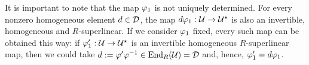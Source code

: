 \documentclass{amsbook}
\begin{document}
















It is important to note that the map $\varphi_1$ is not uniquely determined. For every nonzero homogeneous element $d\in\mathcal{D}$, the map $d\varphi_1: \mathcal U \to \mathcal U^\star$ is also an invertible, homogeneous and $R$-superlinear. If we consider $\varphi_1$ fixed, every such map can be obtained this way: if $\varphi_1' : \mathcal U \to \mathcal U^\star$ is an invertible homogeneous $R$-superlinear map, then we could take $d := \varphi'\varphi^{-1} \in \operatorname{End}_R(\mathcal U) = \mathcal{D}$ and, hence, $\varphi_1' = d \varphi_1$.
\end{document}
